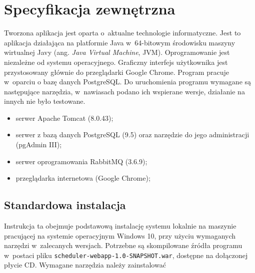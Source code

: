 \documentclass[a4paper]{book}
\newcommand{\obcy}[2]{{\selectlanguage{#1}#2}}
\newcommand{\ang}[1]{\emph{\obcy{british}{#1}}}
\begin{document}
\chapter{Specyfikacja zewnętrzna}

Tworzona aplikacja jest oparta o~aktualne technologie informatyczne. Jest to aplikacja działająca na platformie Java w~64-bitowym środowisku maszyny wirtualnej Javy (ang. \ang{Java Virtual Machine}, JVM). Oprogramowanie jest niezależne od systemu operacyjnego. Graficzny interfejs użytkownika jest przystosowany głównie do przeglądarki Google Chrome. Program pracuje w~oparciu o bazę danych PostgreSQL. Do uruchomienia programu wymagane są następujące narzędzia, w~nawiasach podano ich wspierane wersje, działanie na innych nie było testowane.

\begin{itemize}
	\item serwer Apache Tomcat (8.0.43);
	\item serwer z bazą danych PostgreSQL (9.5) oraz narzędzie do jego administracji (pgAdmin III);
	\item serwer oprogramowania RabbitMQ (3.6.9);
	\item przeglądarka internetowa (Google Chrome);
\end{itemize}

\section{Standardowa instalacja}
Instrukcja ta obejmuje podstawową instalację systemu lokalnie na maszynie pracującej na systemie operacyjnym Windows 10, przy użyciu wymaganych narzędzi w~zalecanych wersjach. Potrzebne są skompilowane źródła programu w~postaci pliku \lstinline|scheduler-webapp-1.0-SNAPSHOT.war|, dostępne na dołączonej płycie CD. Wymagane narzędzia należy zainstalować
\end{document}
